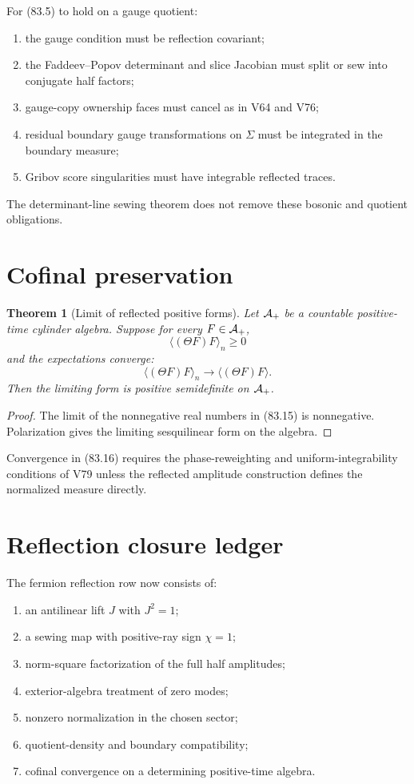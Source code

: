 \documentclass[11pt]{article}
\newtheorem{theorem}{Theorem}[section]
\theoremstyle{remark}
\begin{document}
For (83.5) to hold on a gauge quotient:
\begin{enumerate}
\item the gauge condition must be reflection covariant;
\item the Faddeev--Popov determinant and slice Jacobian must split
      or sew into conjugate half factors;
\item gauge-copy ownership faces must cancel as in V64 and V76;
\item residual boundary gauge transformations on \(\Sigma\) must
      be integrated in the boundary measure;
\item Gribov score singularities must have integrable reflected
      traces.
\end{enumerate}
The determinant-line sewing theorem does not remove these bosonic
and quotient obligations.

\section{Cofinal preservation}

\begin{theorem}[Limit of reflected positive forms]
\label{thm:v15v83-limit}
Let \({\cal A}_+\) be a countable positive-time cylinder algebra.
Suppose for every \(F\in{\cal A}_+\),
\[
 \langle(\Theta F)F\rangle_n\geq0                     \tag{83.15}
\]
and the expectations converge:
\[
 \langle(\Theta F)F\rangle_n
 \longrightarrow
 \langle(\Theta F)F\rangle.                           \tag{83.16}
\]
Then the limiting form is positive semidefinite on
\({\cal A}_+\).
\end{theorem}

\begin{proof}
The limit of the nonnegative real numbers in (83.15) is
nonnegative.  Polarization gives the limiting sesquilinear form on
the algebra.
\end{proof}

Convergence in (83.16) requires the phase-reweighting and
uniform-integrability conditions of V79 unless the reflected
amplitude construction defines the normalized measure directly.

\section{Reflection closure ledger}

The fermion reflection row now consists of:
\begin{enumerate}
\item an antilinear lift \(J\) with \(J^2=1\);
\item a sewing map with positive-ray sign \(\chi=1\);
\item norm-square factorization of the full half amplitudes;
\item exterior-algebra treatment of zero modes;
\item nonzero normalization in the chosen sector;
\item quotient-density and boundary compatibility;
\item cofinal convergence on a determining positive-time algebra.
\end{enumerate}
\end{document}
